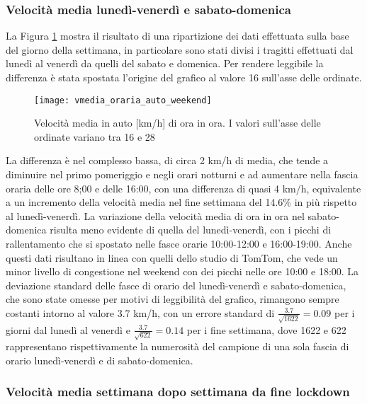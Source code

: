 \subsubsection{Velocità media lunedì-venerdì e sabato-domenica}

La Figura \ref{image:4} mostra il risultato di una ripartizione dei dati effettuata sulla base del giorno della settimana, in particolare sono stati divisi i tragitti effettuati dal lunedì al venerdì da quelli del sabato e domenica. Per rendere leggibile la differenza è stata spostata l'origine del grafico al valore 16 sull'asse delle ordinate. 

\begin{figure}[H]
	\centering
	\texttt{[image: vmedia\_oraria\_auto\_weekend]}
	\caption{Velocità media in auto [km/h] di ora in ora. I valori sull'asse delle ordinate variano tra 16 e 28}
	\label{image:4}
\end{figure}

La differenza è nel complesso bassa, di circa 2 km/h di media, che tende a diminuire nel primo pomeriggio e negli orari notturni e ad aumentare nella fascia oraria delle ore 8;00 e delle 16:00, con una differenza di quasi 4 km/h, equivalente a un incremento della velocità media nel fine settimana del 14.6\% in più rispetto al lunedì-venerdì. La variazione della velocità media di ora in ora nel sabato-domenica risulta meno evidente di quella del lunedì-venerdì, con i picchi di rallentamento che si spostato nelle fasce orarie 10:00-12:00 e 16:00-19:00. Anche questi dati risultano in linea con quelli dello studio di TomTom, che vede un minor livello di congestione nel weekend con dei picchi nelle ore 10:00 e 18:00. La deviazione standard delle fasce di orario del lunedì-venerdì e sabato-domenica, che sono state omesse per motivi di leggibilità del grafico, rimangono sempre costanti intorno al valore 3.7 km/h, con un errore standard di $\frac{3.7}{\sqrt{1622}} = 0.09$ per i giorni dal lunedì al venerdì e $\frac{3.7}{\sqrt{622}} = 0.14$ per i fine settimana, dove 1622 e 622 rappresentano rispettivamente la numerosità del campione di una sola fascia di orario lunedì-venerdì e di sabato-domenica.

\subsubsection{Velocità media settimana dopo settimana da fine lockdown}

